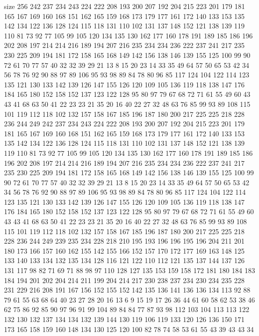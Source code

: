 size 256
242 237 234 243 224 222 208 193 200 207 192 204 215 223 201 179 181 165 167 169
160 168 151 162 165 159 168 173 179 177 161 172 140 133 153 135 142 134 122 136
128 124 115 118 131 110 102 131 137 148 152 121 138 139 119 110 81 73 92 77
105 99 105 120 134 135 130 162 177 160 178 191 189 185 186 196 202 208 197 214
214 216 189 194 207 216 235 234 234 236 222 237 241 217 235 230 225 209 194 181
172 158 165 168 149 142 156 138 146 139 155 125 100 99 90 72 61 70 77 57
40 32 32 39 29 21 13 8 15 20 23 14 33 35 49 64 57 50 65 53
42 34 56 78 76 92 90 88 97 89 106 95 93 98 89 84 78 80 96 85
117 124 104 122 114 123 135 121 130 133 142 139 126 147 155 126 120 109 105 136
119 118 138 147 176 184 165 180 152 158 152 137 123 122 128 95 80 97 79 67
68 72 71 61 55 49 60 43 43 41 68 63 50 41 22 23 23 21 35 20
16 40 22 27 32 48 63 76 85 99 93 89 108 115 101 119 112 118 102 132
157 158 167 185 196 187 180 200 217 225 225 218 228 236 244 249 242 237 234 243
224 222 208 193 200 207 192 204 215 223 201 179 181 165 167 169 160 168 151 162
165 159 168 173 179 177 161 172 140 133 153 135 142 134 122 136 128 124 115 118
131 110 102 131 137 148 152 121 138 139 119 110 81 73 92 77 105 99 105 120
134 135 130 162 177 160 178 191 189 185 186 196 202 208 197 214 214 216 189 194
207 216 235 234 234 236 222 237 241 217 235 230 225 209 194 181 172 158 165 168
149 142 156 138 146 139 155 125 100 99 90 72 61 70 77 57 40 32 32 39
29 21 13 8 15 20 23 14 33 35 49 64 57 50 65 53 42 34 56 78
76 92 90 88 97 89 106 95 93 98 89 84 78 80 96 85 117 124 104 122
114 123 135 121 130 133 142 139 126 147 155 126 120 109 105 136 119 118 138 147
176 184 165 180 152 158 152 137 123 122 128 95 80 97 79 67 68 72 71 61
55 49 60 43 43 41 68 63 50 41 22 23 23 21 35 20 16 40 22 27
32 48 63 76 85 99 93 89 108 115 101 119 112 118 102 132 157 158 167 185
196 187 180 200 217 225 225 218 228 236 244 249 239 235 234 228 218 210 195 193
196 196 195 196 204 211 201 180 173 166 157 160 162 155 142 155 166 152 157 170
172 177 169 163 148 125 133 140 133 134 132 135 134 128 116 121 122 110 112 121
135 137 144 137 126 131 117 98 82 71 69 71 88 98 97 110 128 127 135 153
159 158 172 181 180 184 183 184 194 201 202 204 214 211 199 204 214 217 230 238
237 234 230 234 235 228 231 229 216 208 191 167 156 152 155 152 142 135 136 141
136 136 134 113 92 88 79 61 55 63 68 64 40 23 27 28 20 16 13 6
9 15 19 17 26 36 44 61 60 58 62 53 38 46 62 75 86 92 85 90
97 96 91 99 104 89 84 84 77 87 93 98 112 103 104 113 113 122 132 130
132 137 134 134 132 139 144 130 119 106 119 133 120 126 136 150 171 173 165 158
159 160 148 134 130 125 120 100 82 78 74 58 53 61 55 43 39 43 43 34
